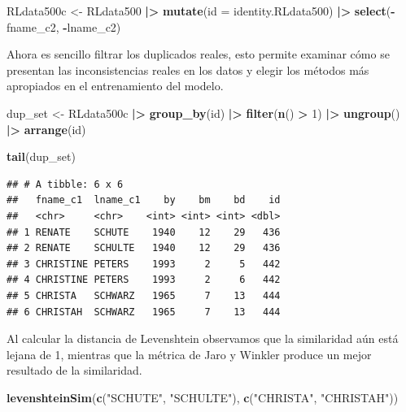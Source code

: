 \documentclass[
  12pt,
]{book}
\newenvironment{Shaded}{\begin{snugshade}}{\end{snugshade}}
\newcommand{\AttributeTok}[1]{\textcolor[rgb]{0.13,0.29,0.53}{#1}}
\newcommand{\DecValTok}[1]{\textcolor[rgb]{0.00,0.00,0.81}{#1}}
\newcommand{\FunctionTok}[1]{\textcolor[rgb]{0.13,0.29,0.53}{\textbf{#1}}}
\newcommand{\NormalTok}[1]{#1}
\newcommand{\OtherTok}[1]{\textcolor[rgb]{0.56,0.35,0.01}{#1}}
\newcommand{\SpecialCharTok}[1]{\textcolor[rgb]{0.81,0.36,0.00}{\textbf{#1}}}
\newcommand{\StringTok}[1]{\textcolor[rgb]{0.31,0.60,0.02}{#1}}
\begin{document}
\begin{Shaded}
\begin{Highlighting}[]
\NormalTok{RLdata500c }\OtherTok{\textless{}{-}}\NormalTok{ RLdata500 }\SpecialCharTok{|\textgreater{}}  
              \FunctionTok{mutate}\NormalTok{(}\AttributeTok{id =}\NormalTok{ identity.RLdata500) }\SpecialCharTok{|\textgreater{}} 
              \FunctionTok{select}\NormalTok{(}\SpecialCharTok{{-}}\NormalTok{fname\_c2, }\SpecialCharTok{{-}}\NormalTok{lname\_c2)}
\end{Highlighting}
\end{Shaded}

Ahora es sencillo filtrar los duplicados reales, esto permite examinar cómo se presentan las inconsistencias reales en los datos y elegir los métodos más apropiados en el entrenamiento del modelo.

\begin{Shaded}
\begin{Highlighting}[]
\NormalTok{dup\_set }\OtherTok{\textless{}{-}}\NormalTok{ RLdata500c }\SpecialCharTok{|\textgreater{}} 
           \FunctionTok{group\_by}\NormalTok{(id) }\SpecialCharTok{|\textgreater{}} 
           \FunctionTok{filter}\NormalTok{(}\FunctionTok{n}\NormalTok{() }\SpecialCharTok{\textgreater{}} \DecValTok{1}\NormalTok{) }\SpecialCharTok{|\textgreater{}}
           \FunctionTok{ungroup}\NormalTok{() }\SpecialCharTok{|\textgreater{}} 
           \FunctionTok{arrange}\NormalTok{(id)}

\FunctionTok{tail}\NormalTok{(dup\_set)}
\end{Highlighting}
\end{Shaded}

\begin{verbatim}
## # A tibble: 6 x 6
##   fname_c1  lname_c1    by    bm    bd    id
##   <chr>     <chr>    <int> <int> <int> <dbl>
## 1 RENATE    SCHUTE    1940    12    29   436
## 2 RENATE    SCHULTE   1940    12    29   436
## 3 CHRISTINE PETERS    1993     2     5   442
## 4 CHRISTINE PETERS    1993     2     6   442
## 5 CHRISTA   SCHWARZ   1965     7    13   444
## 6 CHRISTAH  SCHWARZ   1965     7    13   444
\end{verbatim}

Al calcular la distancia de Levenshtein observamos que la similaridad aún está lejana de 1, mientras que la métrica de Jaro y Winkler produce un mejor resultado de la similaridad.

\begin{Shaded}
\begin{Highlighting}[]
\FunctionTok{levenshteinSim}\NormalTok{(}\FunctionTok{c}\NormalTok{(}\StringTok{"SCHUTE"}\NormalTok{, }\StringTok{"SCHULTE"}\NormalTok{),}
               \FunctionTok{c}\NormalTok{(}\StringTok{"CHRISTA"}\NormalTok{, }\StringTok{"CHRISTAH"}\NormalTok{))}
\end{Highlighting}
\end{Shaded}
\end{document}
